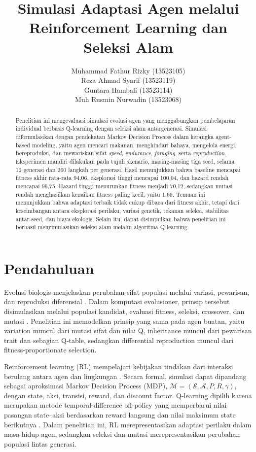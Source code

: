 \documentclass[10pt]{article}
\title{\textbf{Simulasi Adaptasi Agen melalui Reinforcement Learning dan Seleksi Alam}}
\author{
Muhammad Fathur Rizky (13523105)\\
Reza Ahmad Syarif (13523119)\\
Guntara Hambali (13523114)\\
Muh Rusmin Nurwadin (13523068)
}
\date{}
\begin{document}
\maketitle

\begin{abstract}
Penelitian ini mengevaluasi simulasi evolusi agen yang menggabungkan pembelajaran individual berbasis Q-learning dengan seleksi alam antargenerasi. Simulasi diformulasikan dengan pendekatan Markov Decision Process dalam kerangka agent-based modeling, yaitu agen mencari makanan, menghindari bahaya, mengelola energi, bereproduksi, dan mewariskan sifat \textit{speed}, \textit{endurance}, \textit{foraging}, serta \textit{reproduction}. Eksperimen mandiri dilakukan pada tujuh skenario, masing-masing tiga seed, selama 12 generasi dan 260 langkah per generasi. Hasil menunjukkan bahwa baseline mencapai fitness akhir rata-rata 94,06, eksplorasi tinggi mencapai 100,04, dan hazard rendah mencapai 96,75. Hazard tinggi menurunkan fitness menjadi 70,12, sedangkan mutasi rendah menghasilkan kenaikan fitness paling kecil, yaitu 1,66. Temuan ini menunjukkan bahwa adaptasi terbaik tidak cukup dibaca dari fitness akhir, tetapi dari keseimbangan antara eksplorasi perilaku, variasi genetik, tekanan seleksi, stabilitas antar-seed, dan biaya ekologis. Selain itu, dapat disimpulkan bahwa penelitian ini berhasil menyimulasikan seleksi alam melalui algoritma Q-learning.
\end{abstract}

\section{Pendahuluan}
Evolusi biologis menjelaskan perubahan sifat populasi melalui variasi, pewarisan, dan reproduksi diferensial \citep{darwin1859origin}. Dalam komputasi evolusioner, prinsip tersebut disimulasikan melalui populasi kandidat, evaluasi fitness, seleksi, crossover, dan mutasi \citep{holland1992adaptation,mitchell1998introduction}. Penelitian ini memodelkan prinsip yang sama pada agen buatan, yaitu variation muncul dari mutasi sifat dan nilai Q, inheritance muncul dari pewarisan trait dan sebagian Q-table, sedangkan differential reproduction muncul dari fitness-proportionate selection.

Reinforcement learning (RL) mempelajari kebijakan tindakan dari interaksi berulang antara agen dan lingkungan \citep{sutton2018reinforcement}. Secara formal, simulasi dapat dipandang sebagai aproksimasi Markov Decision Process (MDP), $\mathcal{M}=(\mathcal{S},\mathcal{A},P,R,\gamma)$, dengan state, aksi, transisi, reward, dan discount factor. Q-learning dipilih karena merupakan metode temporal-difference off-policy yang memperbarui nilai pasangan state--aksi berdasarkan reward langsung dan nilai maksimum state berikutnya \citep{watkins1992q}. Dalam penelitian ini, RL merepresentasikan adaptasi perilaku dalam masa hidup agen, sedangkan seleksi dan mutasi merepresentasikan perubahan populasi lintas generasi.
\end{document}
